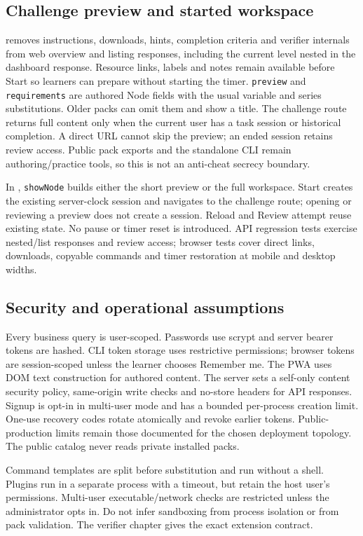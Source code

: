 \subsection{Challenge preview and started workspace}
 removes instructions, downloads, hints,
completion criteria and verifier internals from web overview and
listing responses, including the current level nested in the dashboard response.
Resource links, labels and notes remain available before Start so learners can
prepare without starting the timer. \texttt{preview} and \texttt{requirements} are authored Node fields with the usual
variable and series substitutions. Older packs can omit them and show a title.
The challenge route returns full content only when the current user has a task
session or historical completion. A direct URL cannot skip the preview; an ended
session retains review access. Public pack exports and the standalone CLI remain
authoring/practice tools, so this is not an anti-cheat secrecy boundary.

In , \texttt{showNode} builds either the short preview or the full
workspace. Start creates the existing server-clock session and navigates to the
challenge route; opening or reviewing a preview does not create a session. Reload
and Review attempt reuse existing state. No pause or timer reset is introduced.
API regression tests exercise nested/list responses and review access; browser
tests cover direct links, downloads, copyable commands and timer restoration at
mobile and desktop widths.

\subsection{Security and operational assumptions}
Every business query is user-scoped. Passwords use scrypt and server bearer tokens
are hashed. CLI token storage uses restrictive permissions; browser tokens are
session-scoped unless the learner chooses Remember me. The PWA uses DOM text construction for authored content. The server
sets a self-only content security policy, same-origin write checks and no-store
headers for API responses. Signup is opt-in in multi-user mode and has a bounded
per-process creation limit. One-use recovery codes rotate atomically and revoke
earlier tokens. Public-production limits remain those documented for the chosen
deployment topology. The public catalog never reads private installed packs.

Command templates are split before substitution and run without a shell. Plugins
run in a separate process with a timeout, but retain the host user's permissions.
Multi-user executable/network checks are restricted unless the administrator opts
in. Do not infer sandboxing from process isolation or from pack validation. The
verifier chapter gives the exact extension contract.

